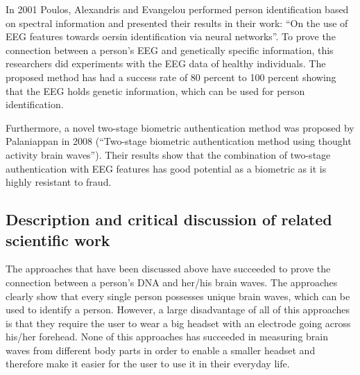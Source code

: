In 2001 Poulos, Alexandris and Evangelou performed person identification based on spectral information and presented their results in their work: “On the use of EEG features towards oersin identification via neural networks”. To prove the connection between a person's EEG and genetically specific information, this researchers did experiments with the EEG data of healthy individuals. The proposed method has had a success rate of 80 percent to 100 percent showing that the EEG holds genetic information, which can be used for person identification.


Furthermore, a novel two-stage biometric authentication method was proposed by Palaniappan in 2008 (“Two-stage biometric authentication method using thought activity brain waves”). Their results show that the combination of two-stage authentication with EEG features has good potential as a biometric as it is highly resistant to fraud.

\subsection{Description and critical discussion of related scientific work}
The approaches that have been discussed above have succeeded to prove the connection between a person's DNA and her/his brain waves. The approaches clearly show that every single person possesses unique brain waves, which can be used to identify a person. However, a large disadvantage of all of this approaches is that they require the user to wear a big headset with an electrode going across his/her forehead. None of this approaches has succeeded in measuring brain waves from different body parts in order to enable a smaller headset and therefore make it easier for the user to use it in their everyday life.

